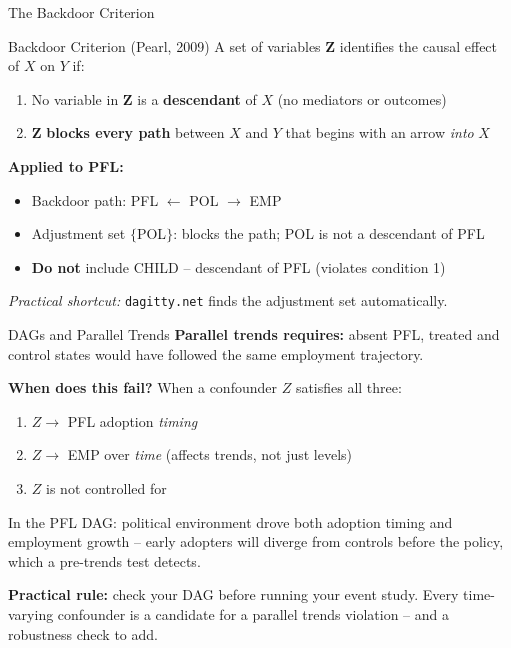 \begin{frame}{The Backdoor Criterion}
  \begin{block}{Backdoor Criterion (Pearl, 2009)}
    A set of variables $\mathbf{Z}$ identifies the causal effect of $X$ on $Y$ if:
    \begin{enumerate}
      \item No variable in $\mathbf{Z}$ is a \textbf{descendant} of $X$ (no mediators or outcomes)
      \item $\mathbf{Z}$ \textbf{blocks every path} between $X$ and $Y$ that begins with an arrow \textit{into} $X$
    \end{enumerate}
  \end{block}

  \vspace{6pt}

  \textbf{Applied to PFL:}
  \begin{itemize}
    \item Backdoor path: PFL $\leftarrow$ POL $\rightarrow$ EMP
    \item Adjustment set $\{$POL$\}$: blocks the path; POL is not a descendant of PFL \checkmark
    \item \textbf{Do not} include CHILD -- descendant of PFL (violates condition 1)
  \end{itemize}

  \vspace{4pt}

  \textit{Practical shortcut:} \texttt{dagitty.net} finds the adjustment set automatically.
\end{frame}

\begin{frame}{DAGs and Parallel Trends}
  \small
  \textbf{Parallel trends requires:} absent PFL, treated and control states would have followed the same employment trajectory.

  \vspace{4pt}

  \textbf{When does this fail?} When a confounder $Z$ satisfies all three:
  \begin{enumerate}
    \item $Z \to$ PFL adoption \textit{timing}
    \item $Z \to$ EMP over \textit{time} (affects trends, not just levels)
    \item $Z$ is not controlled for
  \end{enumerate}

  \vspace{4pt}

  In the PFL DAG: political environment drove both adoption timing and employment growth -- early adopters will diverge from controls before the policy, which a pre-trends test detects.

  \vspace{6pt}

  \textbf{Practical rule:} check your DAG before running your event study. Every time-varying confounder is a candidate for a parallel trends violation -- and a robustness check to add.
\end{frame}

